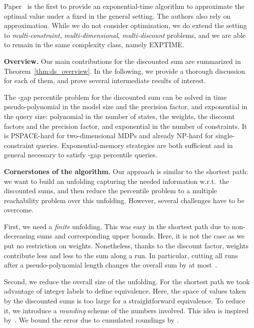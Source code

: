 \documentclass{llncs}
\newcommand\NPTIME{\textrm{\sf NP}}
\newcommand\PSPACE{\textrm{\sf PSPACE}}
\newcommand\EXPTIME{\textrm{\sf EXPTIME}}
\begin{document}
Paper~\cite{DBLP:conf/fsttcs/BrazdilCFNS13} is the first to provide an exponential-time algorithm to approximate the optimal value  under a fixed  in the general setting. The authors also rely on approximation. While we do not consider optimization, we do extend the setting to \textit{multi-constraint}, \textit{multi-dimensional}, \textit{multi-discount} problems, and we are able to remain in the same complexity class, namely \EXPTIME.

\smallskip\noindent\textbf{Overview.} Our main contributions for the discounted sum are summarized in Theorem~\ref{thm:ds_overview}. In the following, we provide a thorough discussion for each of them, and prove several intermediate results of interest.
 
\begin{theorem}
\label{thm:ds_overview}
The -gap percentile problem for the discounted sum can be solved in time pseudo-polynomial in the model size and the precision factor, and exponential in the query size: polynomial in the number of states, the weights, the discount factors and the precision factor, and exponential in the number of constraints. It is \PSPACE-hard for two-dimensional MDPs and already \NPTIME-hard for single-constraint queries. Exponential-memory strategies are both sufficient and in general necessary to satisfy -gap percentile queries.
\end{theorem}

\smallskip\noindent\textbf{Cornerstones of the algorithm.} Our approach is similar to the shortest path: we want to build an unfolding capturing the needed information w.r.t.~the discounted sums, and then reduce the percentile problem to a multiple reachability problem over this unfolding. However, several challenges have to be overcome.

First, we need a \textit{finite} unfolding. This was easy in the shortest path due to non-decreasing sums and corresponding upper bounds. Here, it is not the case as we put no restriction on weights. 
Nonetheless, thanks to the discount factor, weights contribute less and less to the sum along a run. In particular, cutting all runs after a pseudo-polynomial length changes the overall sum by at most~.

Second, we reduce the overall size of the unfolding.
For the shortest path we took advantage of integer labels to define equivalence. Here, the space of values taken by the discounted sums is too large for a straightforward equivalence.
To reduce it, we introduce a \textit{rounding} scheme of the numbers involved. This idea is inspired by~\cite{DBLP:conf/fsttcs/BrazdilCFNS13}. We bound the error due to cumulated roundings by .
\end{document}
